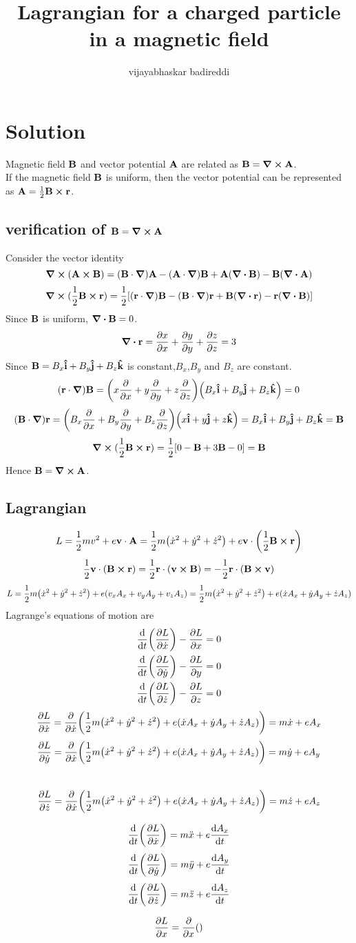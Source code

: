 \documentclass[12pt]{article}
\title{Lagrangian for a charged particle in a magnetic field}
\author{vijayabhaskar badireddi}
\date{}
\begin{document}

\section*{Solution}
Magnetic field $\vb{B}$ and vector potential $\vb{A}$ are related as \(\vb{B}=\curl{\vb{A}}\).\\ If the magnetic field $\vb{B}$ is uniform, then the vector potential can be represented as $\vb{A}=\frac{1}{2}\vb{B}\cp\vb{r}$.
\subsection*{verification of \(\vb{B}=\curl{\vb{A}}\)}
Consider the vector identity \[\curl{(\vb{A}\cp\vb{B})}=(\vb{B}\cdot\grad)\vb{A}-(\vb{A}\cdot\grad)\vb{B}+\vb{A}(\div{\vb{B}})-\vb{B}(\div{\vb{A}})\]
\[\curl{(\frac{1}{2}\vb{B}\cp\vb{r})}=\frac{1}{2}\qty[(\vb{r}\cdot\grad)\vb{B}-(\vb{B}\cdot\grad)\vb{r}+\vb{B}(\div{\vb{r}})-\vb{r}(\div{\vb{B}})]\]
Since $\vb{B}$ is uniform, $\div{\vb{B}}=0$.
\[\div{\vb{r}}=\pdv{x}{x}+\pdv{y}{y}+\pdv{z}{z}=3\]
Since $\vb{B}=B_x\vu{i}+B_y\vu{j}+B_z\vu{k}$ is constant,$B_x$,$B_y$ and $B_z$ are constant.  \[(\vb{r}\cdot\grad)\vb{B}=\qty(x\pdv{x}+y\pdv{y}+z\pdv{z})\qty(B_x\vu{i}+B_y\vu{j}+B_z\vu{k})=0\]
\[(\vb{B}\cdot\grad)\vb{r}=\qty(B_x\pdv{x}+B_y\pdv{y}+B_z\pdv{z})\qty(x\vu{i}+y\vu{j}+z\vu{k})=B_x\vu{i}+B_y\vu{j}+B_z\vu{k}=\vb{B}\]
\[\curl{(\frac{1}{2}\vb{B}\cp\vb{r})}=\frac{1}{2}\qty[0-\vb{B}+3\vb{B}-0]=\vb{B}\]
Hence \(\vb{B}=\curl{\vb{A}}\).
\subsection*{Lagrangian}
\[L=\frac{1}{2}mv^2+e\vb{v}\cdot\vb{A}=\frac{1}{2}m\qty(\dot{x}^2+\dot{y}^2+\dot{z}^2)+e\vb{v}\cdot\qty(\frac{1}{2}\vb{B}\cp\vb{r})\]
\[\frac{1}{2}\vb{v}\cdot\qty(\vb{B}\cp\vb{r})=\frac{1}{2}\vb{r}\cdot\qty(\vb{v}\cp\vb{B})=-\frac{1}{2}\vb{r}\cdot\qty(\vb{B}\cp\vb{v})\]
\[L=\frac{1}{2}m\qty(\dot{x}^2+\dot{y}^2+\dot{z}^2)+e\qty(v_xA_x+v_yA_y+v_zA_z)=\frac{1}{2}m\qty(\dot{x}^2+\dot{y}^2+\dot{z}^2)+e\qty(\dot{x}A_x+\dot{y}A_y+\dot{z}A_z)\]
Lagrange's equations of motion are 
\begin{align*}
\dv{t}\qty(\pdv{L}{\dot{x}})-\pdv{L}{x}=0\\
\dv{t}\qty(\pdv{L}{\dot{y}})-\pdv{L}{y}=0\\
\dv{t}\qty(\pdv{L}{\dot{z}})-\pdv{L}{z}=0
\end{align*}
\[\pdv{L}{\dot{x}}=\pdv{\dot{x}}\qty(\frac{1}{2}m\qty(\dot{x}^2+\dot{y}^2+\dot{z}^2)+e\qty(\dot{x}A_x+\dot{y}A_y+\dot{z}A_z))=m\dot{x}+eA_x\]
\[\pdv{L}{\dot{y}}=\pdv{\dot{x}}\qty(\frac{1}{2}m\qty(\dot{x}^2+\dot{y}^2+\dot{z}^2)+e\qty(\dot{x}A_x+\dot{y}A_y+\dot{z}A_z))=m\dot{y}+eA_y\]\
\[\pdv{L}{\dot{z}}=\pdv{\dot{x}}\qty(\frac{1}{2}m\qty(\dot{x}^2+\dot{y}^2+\dot{z}^2)+e\qty(\dot{x}A_x+\dot{y}A_y+\dot{z}A_z))=m\dot{z}+eA_z\]

\[\dv{t}\qty(\pdv{L}{\dot{x}})=m\ddot{x}+e\dv{A_x}{t}\]
\[\dv{t}\qty(\pdv{L}{\dot{y}})=m\ddot{y}+e\dv{A_y}{t}\]
\[\dv{t}\qty(\pdv{L}{\dot{z}})=m\ddot{z}+e\dv{A_z}{t}\]

\[\pdv{L}{x}=\pdv{x}\qty()\]
\end{document}
